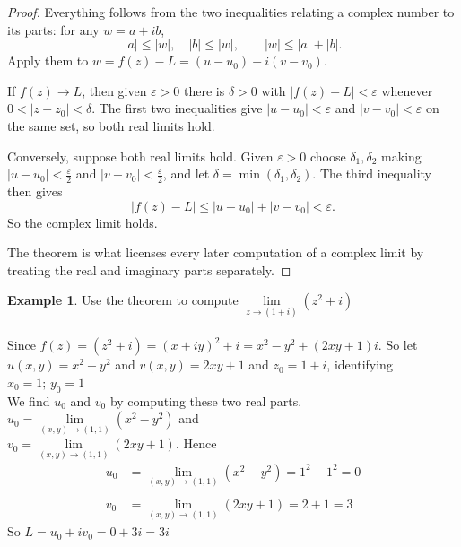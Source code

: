 \documentclass[11pt,a4paper]{article}
\theoremstyle{definition}
\newtheorem{example}[thm]{Example}
\begin{document}
\begin{proof}
Everything follows from the two inequalities relating a complex number to its
parts: for any $w=a+ib$,
$$\left|a\right|\leq\left|w\right|,\quad\left|b\right|\leq\left|w\right|,
\qquad \left|w\right|\leq\left|a\right|+\left|b\right| .$$
Apply them to $w=f(z)-L=(u-u_0)+i(v-v_0)$.

If $f(z)\rightarrow L$, then given $\varepsilon>0$ there is $\delta>0$ with
$\left|f(z)-L\right|<\varepsilon$ whenever $0<\left|z-z_0\right|<\delta$. The
first two inequalities give $\left|u-u_0\right|<\varepsilon$ and
$\left|v-v_0\right|<\varepsilon$ on the same set, so both real limits hold.

Conversely, suppose both real limits hold. Given $\varepsilon>0$ choose
$\delta_1,\delta_2$ making $\left|u-u_0\right|<\frac{\varepsilon}{2}$ and
$\left|v-v_0\right|<\frac{\varepsilon}{2}$, and let
$\delta=\min(\delta_1,\delta_2)$. The third inequality then gives
$$\left|f(z)-L\right|\leq\left|u-u_0\right|+\left|v-v_0\right|<\varepsilon .$$
So the complex limit holds.

The theorem is what licenses every later computation of a complex limit by
treating the real and imaginary parts separately.
\end{proof}

\begin{example}
Use the theorem to compute $\lim\limits_{z \rightarrow (1 + i) }(z^2 + i)$\\


\text{\textcolor{red}{Solution}}\\
Since $f(z) = (z^2 + i) = (x + iy)^2 + i = x^2 - y^2 + (2xy + 1)i$. So let $u(x,y) = x^2 - y^2$ and $v(x,y) = 2xy + 1$ and $z_0 = 1 + i$, identifying $x_0 = 1;\, y_0 = 1$\\
We find $u_0$ and $v_0$ by computing these two real parts. $u_0 = \lim\limits_{(x,y) \rightarrow (1,1)} (x^2 - y^2 )$ and\\ $v_0 = \lim\limits_{(x,y) \rightarrow (1,1)} (2xy + 1)$. Hence
\begin{align*}
u_0 & = \lim\limits_{(x,y) \rightarrow (1,1)} (x^2 - y^2 ) = 1^2 - 1^2 = 0\\\\
v_0 & = \lim\limits_{(x,y) \rightarrow (1,1)} (2xy + 1) = 2 + 1 = 3
\end{align*}
So $L = u_0 + iv_0 = 0 + 3i = 3i$
\end{example}
\end{document}
